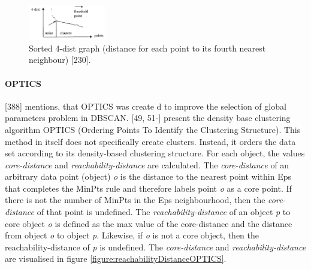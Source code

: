 \begin{figure}[h]
  \centering
  \includegraphics[width=0.3\textwidth]{./images/sortedKGraphDBSCAN.png}
  \caption{Sorted 4-dist graph (distance for each point to its fourth nearest neighbour) \autocite{DBSCAN}[230].}
  \label{figure:sortedKGraphDBSCAN}
\end{figure}




\paragraph{OPTICS}
\textcite{han2011data}[388] mentions, that OPTICS was create d to improve the selection of global parameters problem in DBSCAN.
\textcite{OPTICS}[49, 51-] present the density base clustering algorithm OPTICS (Ordering Points To Identify the Clustering Structure). This method in itself does not specifically create clusters. Instead, it orders the data set according to its density-based clustering structure. For each object, the values \textit{core-distance} and \textit{reachability-distance} are calculated. The \textit{core-distance} of an arbitrary data point (object) \textit{o} is the distance to the nearest point within Eps that completes the MinPts rule and therefore labels point \textit{o} as a core point. If there is not the number of MinPts in the Eps neighbourhood, then the \textit{core-distance} of that point is undefined. The \textit{reachability-distance} of an object \textit{p} to core object \textit{o}  is defined as the max value of the core-distance and the distance from object \textit{o} to object \textit{p}. Likewise, if \textit{o} is not a core object, then the {reachability-distance} of \textit{p} is undefined. The \textit{core-distance} and \textit{reachability-distance} are visualised in figure \ref{figure:reachabilityDistanceOPTICS}.

